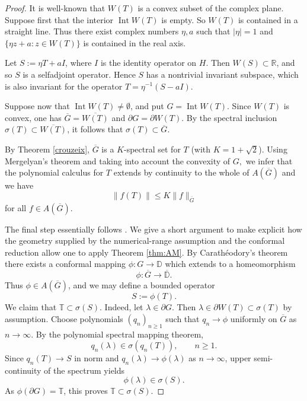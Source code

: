 \documentclass[11pt]{amsart}
\makeatletter
\numberwithin{equation}{section}
\theoremstyle{definition}
\theoremstyle{remark}
\newcommand{\loccite}[2]{[\@ifundefined{b@#2}{\textbf{??}}{\csname b@#2\endcsname}, #1]}
\DeclareMathOperator{\Int}{Int}
\newcommand{\RR}{\mathbb{R}}
\newcommand{\DD}{\mathbb{D}}
\makeatother
\begin{document}
\begin{proof}
It is well-known that $W(T)$ is a convex subset of the complex plane. Suppose first that the interior $\Int W(T)$ is empty.
So $W(T)$ is contained in a straight line. Thus there exist complex numbers $\eta, a$ such that $|\eta|=1$ and 
$\{\eta z+a:z\in W(T)\}$ is contained in the real axis.

Let $S:=\eta T+ aI$, where $I$ is the identity operator on $H$. Then $W(S)\subset\RR$, and so $S$ is a selfadjoint operator.
Hence $S$ has a nontrivial invariant subspace, which is also invariant for the operator $T=\eta^{-1}(S- aI)$.

Suppose now that $\Int W(T)\ne\emptyset$, and put $G=\Int W(T)$. Since $W(T)$ is convex, one has
$\overline{G}=\overline{W(T)}$ and $\partial G=\partial W(T)$. By the spectral inclusion
$\sigma(T)\subset\overline{W(T)}$, it follows that $\sigma(T)\subset\overline{G}$.

By 
Theorem \ref{crouzeix},
$\overline G$ is a $K$-spectral set for $T$ (with $K=1+\sqrt2$). Using Mergelyan's theorem and taking into account the convexity of $G,$ we infer 
that 
 the polynomial calculus for $T$ extends by continuity to the whole of $A(\overline G)$
and we have
$$
\|f(T)\|\le K\|f\|_{\overline G}
$$
for all $f\in A(\overline G).$

The final step essentially follows \cite[Remark]{KL}. We give a short
argument to make explicit how the geometry supplied by the numerical-range
assumption and the conformal reduction allow one to apply Theorem
\ref{thm:AM}.
By Carath\'eodory's theorem there exists a conformal mapping $\phi:G\to\DD$
which extends to a homeomorphism
$$
\phi:\overline G\to\overline{\DD}.
$$
Thus $\phi\in A(\overline G)$, and we may define a bounded operator
$$
S:=\phi(T).
$$
We claim that $\mathbb T \subset\sigma(S)$. Indeed, let $\lambda\in\partial G$. Then $\lambda\in\partial W(T)\subset\sigma(T)$ by assumption. Choose polynomials $(q_n)_{n\ge1}$ such that $q_n\to\phi$ uniformly on $\overline G$ as $n\to\infty$. By the polynomial spectral mapping theorem,
$$
q_n(\lambda)\in\sigma(q_n(T)),\qquad n\ge1.
$$
Since $q_n(T)\to S$ in norm and $q_n(\lambda)\to\phi(\lambda)$ as $n \to \infty$, upper semi-continuity of the spectrum
yields
$$
\phi(\lambda)\in\sigma(S).
$$
As $\phi(\partial G)=\mathbb T$, this proves $\mathbb T \subset\sigma(S)$.


\end{proof}
\end{document}
